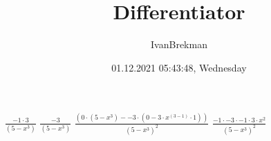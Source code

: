 \documentclass{article}
\title{Differentiator}
\author{IvanBrekman}
\date{01.12.2021 05:43:48, Wednesday}
\begin{document}
\maketitle

$ \frac{-1 \cdot 3}{(5 - {x}^{3})} $
$ \frac{-3}{(5 - {x}^{3})} $
$ \frac{(0 \cdot (5 - {x}^{3}) - -3 \cdot (0 - 3 \cdot {x}^{(3 - 1)} \cdot 1))}{{(5 - {x}^{3})}^{2}} $
$ \frac{-1 \cdot -3 \cdot -1 \cdot 3 \cdot {x}^{2}}{{(5 - {x}^{3})}^{2}} $
\end{document}
